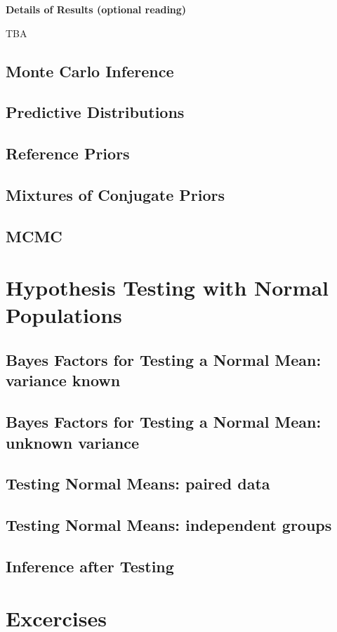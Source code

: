 \documentclass[]{book}
\theoremstyle{definition}
\theoremstyle{definition}
\theoremstyle{remark}
\begin{document}
\textbf{Details of Results (optional reading)}

TBA

\subsection{Monte Carlo Inference}\label{sec:NG-MC}

\subsection{Predictive Distributions}\label{sec:NG-predictive}

\subsection{Reference Priors}\label{sec:NG-reference}

\subsection{Mixtures of Conjugate Priors}\label{sec:NG-Cauchy}

\subsection{MCMC}\label{sec:NG-MCMC}

\section{Hypothesis Testing with Normal
Populations}\label{hypothesis-testing-with-normal-populations}

\subsection{Bayes Factors for Testing a Normal Mean: variance
known}\label{bayes-factors-for-testing-a-normal-mean-variance-known}

\subsection{Bayes Factors for Testing a Normal Mean: unknown
variance}\label{bayes-factors-for-testing-a-normal-mean-unknown-variance}

\subsection{Testing Normal Means: paired
data}\label{testing-normal-means-paired-data}

\subsection{Testing Normal Means: independent
groups}\label{testing-normal-means-independent-groups}

\subsection{Inference after Testing}\label{inference-after-testing}

\section{Excercises}\label{excercises}


\end{document}

